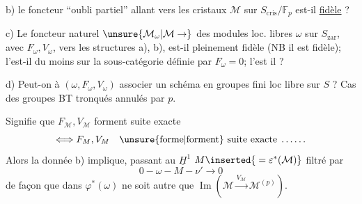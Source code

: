 b) le foncteur ``oubli partiel''  allant vers les cristaux $\mathcal M$ sur $S_{\mathrm{cris}}/\mathbb F_p$ est-il \uline{fidèle} ?

c) Le foncteur naturel $\unsure{\mathcal M_\omega|\mathcal M\to}$ des modules loc. libres $\omega$ sur $S_{\mathrm{zar}}$, avec $F_\omega,V_\omega$, vers les structures a), b), est-il pleinement fidèle (NB il est fidèle); l'est-il du moins   sur la sous-catégorie définie par $F_\omega=0$; l'est il  ?

d) Peut-on à $(\omega,F_\omega,V_\omega)$ associer un schéma en groupes fini loc libre sur $S$ ?
Cas des groupes BT tronqués annulés par $p$.

Signifie que $F_{\mathcal M},V_{\mathcal M}$ forment suite exacte
\[
\Longleftrightarrow F_M,V_M\quad\text{\unsure{forme|forment} suite exacte}\;\ldots\ldots
\]
Alors la donnée b) implique, passant au $\underline H^1$
$M\inserted{{}=\varepsilon^*(\mathcal M)}$ filtré par
\[
0\mathbin{-}\omega\mathbin{-}M\mathbin{-}\nu'\longrightarrow0
\]
de façon que dans
$\varphi^*(\omega)$ ne soit autre que $\operatorname{Im}(\mathcal M\xrightarrow{V_{\mathcal M}}\mathcal M^{(p)})$.

